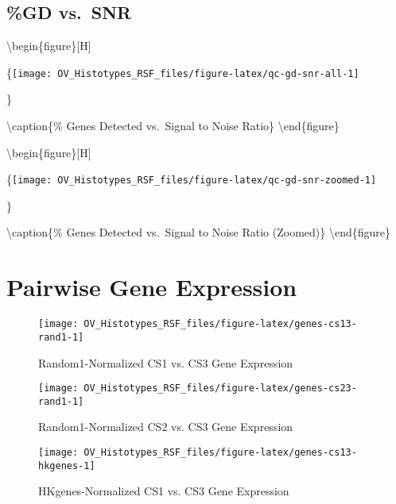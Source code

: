 \documentclass[
]{report}
\begin{document}
\hypertarget{gd-vs.-snr}{%
\subsection{\%GD vs.~SNR}\label{gd-vs.-snr}}

\textbackslash begin\{figure\}{[}H{]}

\{\centering \texttt{[image: OV\_Histotypes\_RSF\_files/figure-latex/qc-gd-snr-all-1]}

\}

\textbackslash caption\{\% Genes Detected vs.~Signal to Noise Ratio\}\label{fig:qc-gd-snr-all}
\textbackslash end\{figure\}

\textbackslash begin\{figure\}{[}H{]}

\{\centering \texttt{[image: OV\_Histotypes\_RSF\_files/figure-latex/qc-gd-snr-zoomed-1]}

\}

\textbackslash caption\{\% Genes Detected vs.~Signal to Noise Ratio (Zoomed)\}\label{fig:qc-gd-snr-zoomed}
\textbackslash end\{figure\}

\hypertarget{pairwise-gene-expression}{%
\section{Pairwise Gene Expression}\label{pairwise-gene-expression}}

\begin{figure}[H]

{\centering \texttt{[image: OV\_Histotypes\_RSF\_files/figure-latex/genes-cs13-rand1-1]} 

}

\caption{Random1-Normalized CS1 vs. CS3 Gene Expression}\label{fig:genes-cs13-rand1}
\end{figure}

\begin{figure}[H]

{\centering \texttt{[image: OV\_Histotypes\_RSF\_files/figure-latex/genes-cs23-rand1-1]} 

}

\caption{Random1-Normalized CS2 vs. CS3 Gene Expression}\label{fig:genes-cs23-rand1}
\end{figure}

\begin{figure}[H]

{\centering \texttt{[image: OV\_Histotypes\_RSF\_files/figure-latex/genes-cs13-hkgenes-1]} 

}

\caption{HKgenes-Normalized CS1 vs. CS3 Gene Expression}\label{fig:genes-cs13-hkgenes}
\end{figure}
\end{document}
